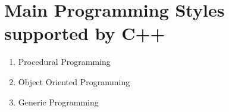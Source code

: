 \documentclass{article}
\begin{document}
 \section*{Main Programming Styles supported by C++}
 \begin{enumerate}
  \item Procedural Programming
  \item Object Oriented Programming
  \item Generic Programming
 \end{enumerate}
\end{document}

